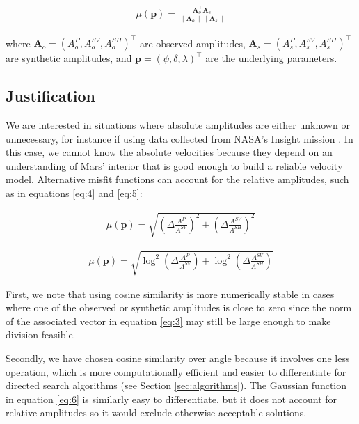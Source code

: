 \documentclass[preprint]{seismica}
\begin{document}
    \begin{align} \label{eq:3}
      \mu(\bm{p}) = \frac{\bm{A}_o^\top\bm{A}_s}{\|\bm{A}_o\|\|\bm{A}_s\|}
    \end{align}

    where $\bm{A}_o = (A_o^P, A_o^{SV}, A_o^{SH})^\top$ are observed amplitudes, $\bm{A}_s =
    (A_s^P, A_s^{SV}, A_s^{SH})^\top$ are synthetic amplitudes, and
    $\bm{p} = (\psi, \delta, \lambda)^\top$ are the underlying parameters.

    \subsection{Justification}
    We are interested in situations where absolute amplitudes are either unknown or unnecessary, for
    instance if using data collected from NASA's Insight mission \citep{sita_potential_2022}.
    In this case, we cannot know the absolute velocities because they depend on an understanding of
    Mars' interior that is good enough to build a reliable velocity model. Alternative misfit
    functions can account for the relative amplitudes, such as in equations \ref{eq:4} and
    \ref{eq:5}:

    \begin{align} \label{eq:4}
      \mu(\bm{p}) = \sqrt{\left( \Delta \frac{A^{P}}{A^{SV}}\right)^2 + \left( \Delta \frac{A^{SV}}{A^{SH}}\right)^2}
    \end{align}

    \begin{align} \label{eq:5}
      \mu(\bm{p}) = \sqrt{\log^2 \left( \Delta \frac{A^P}{A^{SV}} \right) + \log^2 \left( \Delta \frac{A^{SV}}{A^{SH}} \right)}
    \end{align}

    First, we note that using cosine similarity is more numerically stable in cases where one of the
    observed or synthetic amplitudes is close to zero since the norm of the associated vector in
    equation \ref{eq:3} may still be large enough to make division feasible.

    Secondly, we have chosen cosine similarity over angle because it involves one less operation,
    which is more computationally efficient and easier to differentiate for directed search
    algorithms (see Section \ref{sec:algorithms}). The Gaussian function in equation \ref{eq:6} is
    similarly easy to differentiate, but it does not account for relative amplitudes so it would
    exclude otherwise acceptable solutions.
\end{document}

